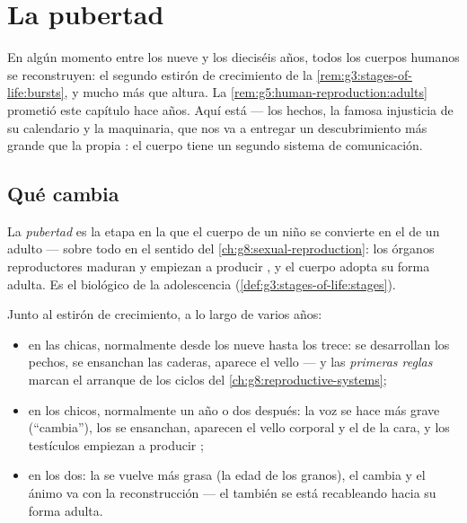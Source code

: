 \chapter{La pubertad}\label{ch:g8:puberty}

En algún momento entre los nueve y los dieciséis años, todos los
cuerpos humanos se reconstruyen: el segundo estirón de crecimiento de
la \cref{rem:g3:stages-of-life:bursts}, y mucho más que altura. La
\cref{rem:g5:human-reproduction:adults} prometió este capítulo hace
años. Aquí está --- los hechos, la famosa injusticia de su calendario y
la maquinaria, que nos va a entregar un descubrimiento más grande que
la propia : el cuerpo tiene un segundo sistema de comunicación.

\section{Qué cambia}

\begin{definition}[Pubertad]\label{def:g8:puberty:puberty}
La \emph{pubertad} es la etapa en la que el cuerpo de
un niño se convierte en el de un adulto --- sobre todo en el sentido
del \cref{ch:g8:sexual-reproduction}: los órganos reproductores maduran
y empiezan a producir \emph{}, y el cuerpo adopta su forma
adulta. Es el  biológico de la adolescencia
(\cref{def:g3:stages-of-life:stages}).
\end{definition}

\begin{proposition}\label{prop:g8:puberty:changes}
Junto al estirón de crecimiento, a lo largo de varios años:
\begin{itemize}
  \item en las chicas, normalmente desde los nueve hasta los trece: se
        desarrollan los pechos, se ensanchan las caderas, aparece el
        vello --- y las \emph{primeras reglas} marcan el arranque de
        los ciclos del \cref{ch:g8:reproductive-systems};
  \item en los chicos, normalmente un año o dos después: la voz se hace
        más grave (``cambia''), los  se ensanchan, aparecen el
        vello corporal y el de la cara, y los testículos empiezan a
        producir ;
  \item en los dos: la  se vuelve más grasa (la edad de los
        granos), el  cambia y el ánimo va con la reconstrucción
        --- el  también se está recableando hacia su forma
        adulta.
\end{itemize}
\end{proposition}
\admitted

